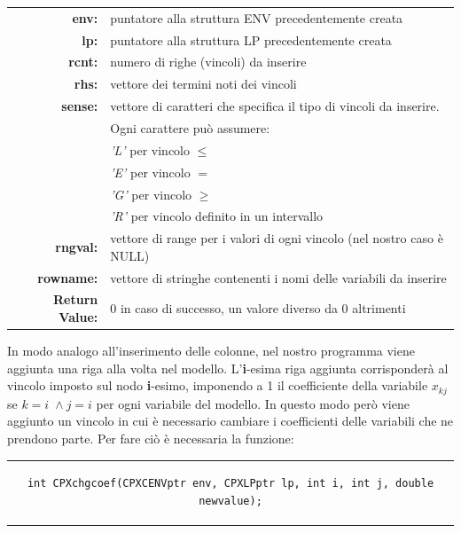 \begin{table}[h]
\centering
\begin{tabular}{rl}
\textbf{env:} & {puntatore alla struttura ENV precedentemente creata}\\
\textbf{lp:} & {puntatore alla struttura LP precedentemente creata}\\
\textbf{rcnt:} & {numero di righe (vincoli) da inserire}\\
\textbf{rhs:} & {vettore dei termini noti dei vincoli}\\
\textbf{sense:} & {vettore di caratteri che specifica il tipo di vincoli da inserire.}\\
&{Ogni carattere può assumere:}\\
&{\textit{'L'} per vincolo $\leq$}\\
&{\textit{'E'} per vincolo $=$}\\
&{\textit{'G'} per vincolo $\geq$}\\
&{\textit{'R'} per vincolo definito in un intervallo}\\
\textbf{rngval:} & {vettore di range per i valori di ogni vincolo (nel nostro caso è NULL)}\\
\textbf{rowname:} & {vettore di stringhe contenenti i nomi delle variabili da inserire}\\
\textbf{Return Value:} & {0 in caso di successo, un valore diverso da 0 altrimenti}\\
\end{tabular}
\end{table}
In modo analogo all'inserimento delle colonne, nel nostro programma viene aggiunta una riga alla volta nel modello. L'\textbf{i}-esima riga aggiunta corrisponderà al vincolo imposto sul nodo \textbf{i}-esimo, imponendo a 1 il coefficiente della variabile $x_{kj}$ se $k=i \;\wedge j=i$ per ogni variabile del modello. In questo modo però viene aggiunto un vincolo in cui è necessario cambiare i coefficienti delle variabili che ne prendono parte. Per fare ciò è necessaria la funzione:
\begin{center}
\begin{tabular}{c}
\begin{lstlisting}[linewidth=380pt, basicstyle=\footnotesize\sffamily,]   
int CPXchgcoef(CPXCENVptr env, CPXLPptr lp, int i, int j, double newvalue);
\end{lstlisting}
\end{tabular}
\end{center}
